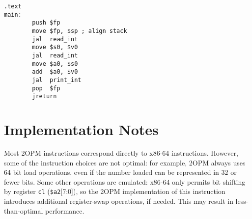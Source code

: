 \documentclass{article}
\begin{document}
\begin{lstlisting}
.text
main:
        push $fp
        move $fp, $sp ; align stack
        jal  read_int
        move $s0, $v0
        jal  read_int
        move $a0, $s0
        add  $a0, $v0
        jal  print_int
        pop  $fp
        jreturn
\end{lstlisting}


\section{Implementation Notes}

Most 2OPM instructions correspond directly to x86-64 instructions.
However, some of the instruction choices are not optimal: for example,
2OPM always uses 64 bit load operations, even if the number loaded can
be represented in 32 or fewer bits.  Some other operations are
emulated: x86-64 only permits bit shifting by register \texttt{cl}
(\texttt{\$a2}[7:0]), so the 2OPM implementation of this instruction
introduces additional register-swap operations, if needed.  This may
result in less-than-optimal performance.
\end{document}
